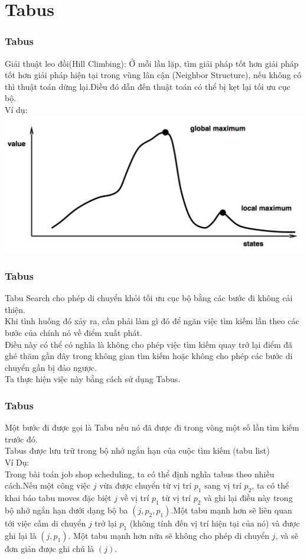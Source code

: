 \documentclass[12pt]{beamer}
\begin{document}
	\section{Tabus}
	\begin{frame}
		\frametitle{Tabus}
		Giải thuật leo đồi(Hill Climbing): Ở mỗi lần lặp, tìm giải pháp tốt hơn giải pháp tốt hơn giải pháp hiện tại trong vùng lân cận (Neighbor Structure), nếu không có thì thuật toán dừng lại.Điều đó dẫn đến thuật toán có thể bị kẹt lại tối ưu cục bộ.\\
		Ví dụ:\\
		\includegraphics[scale=0.4]{HillClimbing.png}\\
	\end{frame}

	\begin{frame}
		\frametitle{Tabus}
		Tabu Search cho phép di chuyển khỏi tối ưu cục bộ bằng các bước đi không cải thiện.\\
		Khi tình huống đó xảy ra, cần phải làm gì đó để ngăn việc tìm kiếm lần theo các bước của chính nó về điểm xuất phát.\\
		Điều này có thể có nghĩa là không cho phép việc tìm kiếm quay trở lại điểm đã ghé thăm gần đây trong không gian tìm kiếm hoặc không cho phép các bước di chuyển gần bị đảo ngược.\\
		Ta thực hiện việc này bằng cách sử dụng Tabus.
	\end{frame}

	\begin{frame}
		\frametitle{Tabus}
		Một bước đi được gọi là Tabu nếu nó đã được đi trong vòng một số lần tìm kiếm trước đó.\\
		Tabus được lưu trữ trong bộ nhớ ngắn hạn của cuộc tìm kiếm (tabu list)\\
		Ví Dụ:\\
		Trong bài toán job shop scheduling, ta có thể định nghĩa tabus theo nhiều cách.Nếu một công việc $j$ vừa được chuyển từ vị trí $p_1$ sang vị trí $p_2$, ta có thể khai báo tabu moves đặc biệt $j$ về vị trí $p_1$ từ vị trí $p_2$ và ghi lại điều này trong bộ nhớ ngắn hạn dưới dạng bộ ba $(j, p_2, p_1)$.Một tabu mạnh hơn sẽ liên quan tới việc cấm di chuyển $j$ trở lại $p_1$ (không tính đến vị trí hiện tại của nó) và được ghi lại là $(j, p_1)$. Một tabu mạnh hơn nữa sẽ không cho phép di chuyển $j$, và sẽ đơn giản được ghi chú là $(j)$.
	\end{frame}
	
\end{document}
